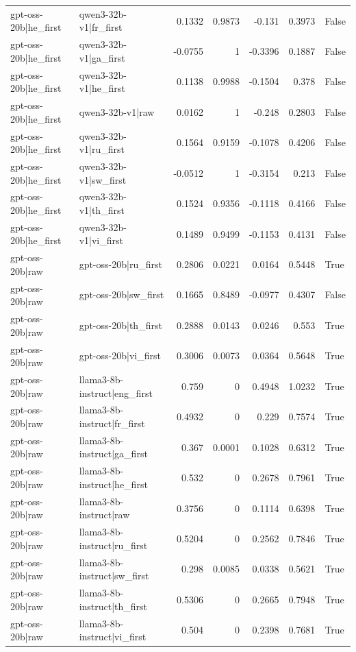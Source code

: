 \begin{table}
\begin{tabular}{l l r r r r l}
gpt-oss-20b|he_first & qwen3-32b-v1|fr_first & 0.1332 & 0.9873 & -0.131 & 0.3973 & False \\
gpt-oss-20b|he_first & qwen3-32b-v1|ga_first & -0.0755 & 1 & -0.3396 & 0.1887 & False \\
gpt-oss-20b|he_first & qwen3-32b-v1|he_first & 0.1138 & 0.9988 & -0.1504 & 0.378 & False \\
gpt-oss-20b|he_first & qwen3-32b-v1|raw & 0.0162 & 1 & -0.248 & 0.2803 & False \\
gpt-oss-20b|he_first & qwen3-32b-v1|ru_first & 0.1564 & 0.9159 & -0.1078 & 0.4206 & False \\
gpt-oss-20b|he_first & qwen3-32b-v1|sw_first & -0.0512 & 1 & -0.3154 & 0.213 & False \\
gpt-oss-20b|he_first & qwen3-32b-v1|th_first & 0.1524 & 0.9356 & -0.1118 & 0.4166 & False \\
gpt-oss-20b|he_first & qwen3-32b-v1|vi_first & 0.1489 & 0.9499 & -0.1153 & 0.4131 & False \\
gpt-oss-20b|raw & gpt-oss-20b|ru_first & 0.2806 & 0.0221 & 0.0164 & 0.5448 & True \\
gpt-oss-20b|raw & gpt-oss-20b|sw_first & 0.1665 & 0.8489 & -0.0977 & 0.4307 & False \\
gpt-oss-20b|raw & gpt-oss-20b|th_first & 0.2888 & 0.0143 & 0.0246 & 0.553 & True \\
gpt-oss-20b|raw & gpt-oss-20b|vi_first & 0.3006 & 0.0073 & 0.0364 & 0.5648 & True \\
gpt-oss-20b|raw & llama3-8b-instruct|eng_first & 0.759 & 0 & 0.4948 & 1.0232 & True \\
gpt-oss-20b|raw & llama3-8b-instruct|fr_first & 0.4932 & 0 & 0.229 & 0.7574 & True \\
gpt-oss-20b|raw & llama3-8b-instruct|ga_first & 0.367 & 0.0001 & 0.1028 & 0.6312 & True \\
gpt-oss-20b|raw & llama3-8b-instruct|he_first & 0.532 & 0 & 0.2678 & 0.7961 & True \\
gpt-oss-20b|raw & llama3-8b-instruct|raw & 0.3756 & 0 & 0.1114 & 0.6398 & True \\
gpt-oss-20b|raw & llama3-8b-instruct|ru_first & 0.5204 & 0 & 0.2562 & 0.7846 & True \\
gpt-oss-20b|raw & llama3-8b-instruct|sw_first & 0.298 & 0.0085 & 0.0338 & 0.5621 & True \\
gpt-oss-20b|raw & llama3-8b-instruct|th_first & 0.5306 & 0 & 0.2665 & 0.7948 & True \\
gpt-oss-20b|raw & llama3-8b-instruct|vi_first & 0.504 & 0 & 0.2398 & 0.7681 & True \\

\end{tabular}
\end{table}
